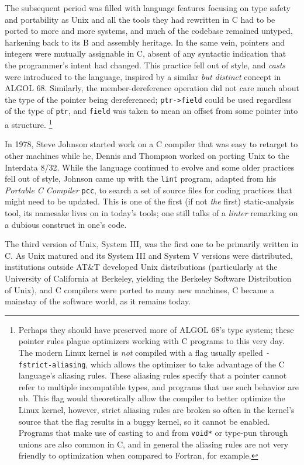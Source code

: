 The subsequent period was filled with language features focusing on type safety
and portability as Unix and all the tools they had rewritten in C had to be ported to more and
more systems, and much of the codebase remained untyped, harkening back to its B and assembly
heritage. In the same vein, pointers and integers were mutually assignable in C,
absent of any syntactic indication that the programmer's intent had changed.
This practice fell out of style, and \textit{casts} were introduced to the language,
inspired by a similar \textit{but distinct} concept in ALGOL 68.
Similarly, the member-dereference operation did not care much about the type of the pointer
being dereferenced; \texttt{ptr->field} could be used regardless of the type of \texttt{ptr},
and \texttt{field} was taken to mean an offset from some pointer into a structure.
\footnote{
	Perhaps they should have preserved more of ALGOL 68's type system; these pointer rules
	plague optimizers working with C programs to this very day.
	The modern Linux kernel is \textit{not} compiled with a flag usually spelled
	\texttt{-fstrict-aliasing}, which allows the optimizer to take advantage of the C language's
	aliasing rules. These aliasing rules specify that a pointer cannot refer to multiple incompatible types,
	and programs that use such behavior are \gls{ub}.
	This flag would theoretically allow the compiler to better optimize the Linux kernel,
	however, strict aliasing rules are broken so often in the kernel's source that the flag
	results in a buggy kernel, so it cannot be enabled.
	Programs that make use of casting to and from \texttt{void*} or
	type-pun through unions are also common in C,
	and in general the aliasing rules are not very friendly to optimization when compared to
	Fortran, for example.
}

In 1978, Steve Johnson started work on a C compiler that was easy to retarget to other machines
while he, Dennis and Thompson worked on porting Unix to the Interdata 8/32.
While the language continued to evolve and some older practices fell out of style, Johnson
came up with the \texttt{lint} program, adapted from his \textit{Portable C Compiler} \texttt{pcc},
to search a set of source files for coding practices that might need to be updated.
This is one of the first (if not \textit{the} first) static-analysis tool, its namesake lives on
in today's tools; one still talks of a \textit{linter} remarking on a dubious construct
in one's code.

The third version of Unix, System III, was the first one to be primarily written in C.
As Unix matured and its System III and System V versions were distributed,
institutions outside AT\&T developed Unix distributions
(particularly at the University of California at Berkeley, yielding the Berkeley
Software Distribution of Unix), and C compilers were ported to many new machines,
C became a mainstay of the software world, as it remains today.

